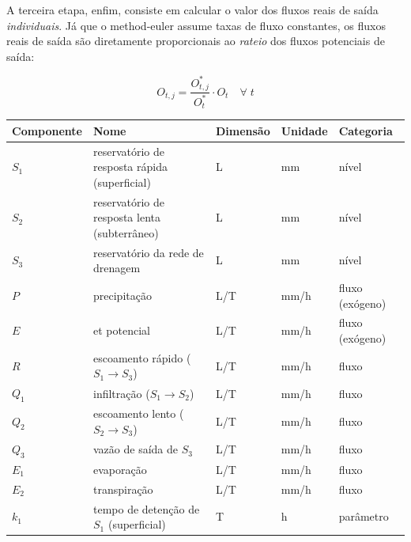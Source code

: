 \documentclass[./main.tex]{subfiles}
\begin{document}
A terceira etapa, enfim, consiste em calcular o valor dos fluxos reais de saída \textit{individuais}. Já que o \gls{method-euler} assume taxas de fluxo constantes, os fluxos reais de saída são diretamente proporcionais ao \textit{rateio} dos fluxos potenciais de saída:
\begin{linenomath*}
\begin{equation} 
	\label{eq:simult_3}
 O_{t, j} = \frac{O^*_{t, j}}{O^*_t} \cdot O_{t} \quad \forall\;t
\end{equation}
\end{linenomath*}

{\renewcommand{\arraystretch}{1.5}%
\begin{table}[t!]
    \centering	
    \tiny
    \sffamily
    \begin{tabular}{ 
        >{\raggedright\arraybackslash}m{1cm}  
        >{\raggedright\arraybackslash}m{5cm}  
        >{\raggedright\arraybackslash}m{1cm}
        >{\raggedright\arraybackslash}m{1cm}
        >{\raggedright\arraybackslash}m{2cm}}
        \toprule
        \textbf{Componente} & \textbf{Nome} & \textbf{Dimensão} & \textbf{Unidade} & \textbf{Categoria} \\ 
        \midrule
        $S_1$ & reservatório de resposta rápida (superficial) & L & mm & nível \\ 
        $S_2$ & reservatório de resposta lenta (subterrâneo) & L & mm & nível \\ 
        $S_3$ & reservatório da rede de drenagem & L & mm & nível \\ 
        $P$ & precipitação & L/T & mm/h & fluxo (exógeno)\\
        $E$ & \acrlong{et} potencial & L/T & mm/h & fluxo (exógeno)\\ 
        $R$ & escoamento rápido ($S_1 \rightarrow S_3$) & L/T & mm/h & fluxo\\ 
        $Q_1$ & infiltração ($S_1 \rightarrow S_2$) & L/T & mm/h & fluxo\\ 
        $Q_2$ & escoamento lento ($S_2 \rightarrow S_3$) & L/T & mm/h & fluxo\\ 
        $Q_3$ & vazão de saída de $S_3$ & L/T & mm/h & fluxo\\ 
        $E_1$ & evaporação & L/T & mm/h & fluxo\\ 
        $E_2$ & transpiração & L/T & mm/h & fluxo\\ 
        $k_1$ & tempo de detenção de $S_1$ (superficial) & T & h & parâmetro \\ 

\end{tabular}
\end{table}}
\end{document}
